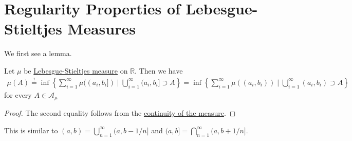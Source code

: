 \section{Regularity Properties of Lebesgue-Stieltjes Measures}
We first see a lemma.
\begin{lemma}
	Let \(\mu\) be \hyperref[def:Lebesgue-Stieltjes-measure]{Lebesgue-Stieltjes measure} on \(\mathbb{R} \). Then we have
	\[
		\begin{split}
			\mu (A) \overset{\hyperref[prop:outer-measure]{!}}{=}\inf\left\{\sum_{i=1}^{\infty} \mu ((a_{i}, b_{i}]) \mid \bigcup_{i=1}^{\infty} (a_{i}, b_{i}]\supset A\right\}
			= \inf\left\{\sum_{i=1}^{\infty} \mu ((a_{i}, b_{i})) \mid \bigcup_{i=1}^{\infty} (a_{i}, b_{i})\supset A\right\}
		\end{split}
	\]
	for every \(A\in \mathcal{A} _\mu \)
\end{lemma}
\begin{proof}
	The second equality follows from the \hyperref[thm:measure-space]{continuity of the measure}.
\end{proof}

\begin{remark}
	This is similar to \((a, b) = \bigcup_{n=1}^{\infty} (a, b - 1/n]\) and \((a, b] = \bigcap_{n=1}^{\infty} (a, b+1/n]\).
\end{remark}